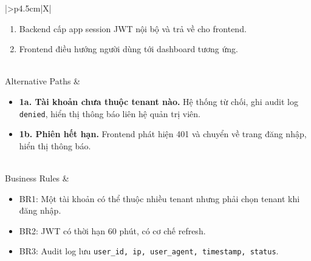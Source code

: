 \begin{xltabular}{\textwidth}{|>{\bfseries}p{4.5cm}|X|}
\begin{enumerate}[leftmargin=*, nosep]
        \item Backend cấp app session JWT nội bộ và trả về cho frontend.
        \item Frontend điều hướng người dùng tới dashboard tương ứng.
    \end{enumerate} \\
    \hline
    Alternative Paths &
    \begin{itemize}[leftmargin=*, nosep]
        \item \textbf{1a. Tài khoản chưa thuộc tenant nào.} Hệ thống từ chối, ghi audit log \texttt{denied}, hiển thị thông báo liên hệ quản trị viên.
        \item \textbf{1b. Phiên hết hạn.} Frontend phát hiện 401 và chuyển về trang đăng nhập, hiển thị thông báo.
    \end{itemize} \\
    \hline
    Business Rules &
    \begin{itemize}[leftmargin=*, nosep]
        \item BR1: Một tài khoản có thể thuộc nhiều tenant nhưng phải chọn tenant khi đăng nhập.
        \item BR2: JWT có thời hạn 60 phút, có cơ chế refresh.
        \item BR3: Audit log lưu \texttt{user\_id, ip, user\_agent, timestamp, status}.
    \end{itemize} \\
    \hline
    \caption{Đặc tả Use Case: Đăng nhập hệ thống} \\
\end{xltabular}

